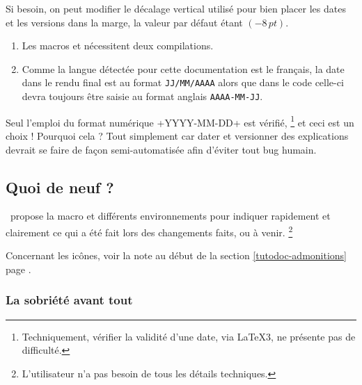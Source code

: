 \begin{tdocexa}
	Si besoin, on peut modifier le décalage vertical utilisé pour bien placer les dates et les versions dans la marge, la valeur par défaut étant $(-8\,\mathit{pt})$.

\end{tdocexa}


\begin{tdocimp}
    \begin{enumerate}[wide]
        \item Les macros  et  nécessitent deux compilations.

        \item Comme la langue détectée pour cette documentation est le français, la date dans le rendu final est au format \texttt{JJ/MM/AAAA} alors que dans le code celle-ci devra toujours être saisie au format anglais \texttt{AAAA-MM-JJ}.
    \end{enumerate}
\end{tdocimp}


\begin{tdoccaut}
    Seul l'emploi du format numérique \tdoclatexin+YYYY-MM-DD+ est vérifié,%
    \footnote{
        Techniquement, vérifier la validité d'une date, via \LaTeX3, ne présente pas de difficulté.
    }
    et ceci est un choix ! Pourquoi cela ? Tout simplement car dater et versionner des explications devrait se faire de façon semi-automatisée afin d'éviter tout bug humain.
\end{tdoccaut}


\subsection{Quoi de neuf ?}

\thisproj\ propose la macro  et différents environnements pour indiquer rapidement et clairement ce qui a été fait lors des changements faits, ou à venir.%
\footnote{
    L'utilisateur n'a pas besoin de tous les détails techniques.
}


\begin{tdocnote}
	Concernant les icônes, voir la note au début de la section \ref{tutodoc-admonitions} page \pageref{tutodoc-admonitions}.
\end{tdocnote}


\subsubsection{La sobriété avant tout}

